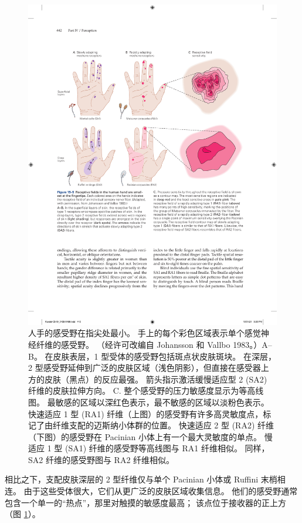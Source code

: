 \begin{figure}[htbp]
	\centering
	\includegraphics[width=1.0\linewidth]{chap19/fig_19_5}
	\caption{人手的感受野在指尖处最小。 
		手上的每个彩色区域表示单个感觉神经纤维的感受野。 （经许可改编自 Johansson 和 Vallbo 1983。）A–B。 
		在皮肤表层，1 型受体的感受野包括斑点状皮肤斑块。 
		在深层，2 型感受野延伸到广泛的皮肤区域（浅色阴影），但直接在感受器上方的皮肤（黑点）的反应最强。 
		箭头指示激活缓慢适应型 2 (SA2) 纤维的皮肤拉伸方向。 
		C. 整个感受野的压力敏感度显示为等高线图。 
		最敏感的区域以深红色表示，最不敏感的区域以淡粉色表示。 
		快速适应 1 型 (RA1) 纤维（上图）的感受野有许多高灵敏度点，标记了由纤维支配的迈斯纳小体群的位置。 
		快速适应 2 型 (RA2) 纤维（下图）的感受野在 Pacinian 小体上有一个最大灵敏度的单点。 
		慢适应 1 型 (SA1) 纤维的感受野等高线图与 RA1 纤维相似。 
		同样，SA2 纤维的感受野图与 RA2 纤维相似。}
	\label{fig:19_5}
\end{figure}

相比之下，支配皮肤深层的 2 型纤维仅与单个 Pacinian 小体或 Ruffini 末梢相连。 
由于这些受体很大，它们从更广泛的皮肤区域收集信息。 
他们的感受野通常包含一个单一的“热点”，那里对触摸的敏感度最高； 该点位于接收器的正上方（图 \ref{fig:19_5}）。


